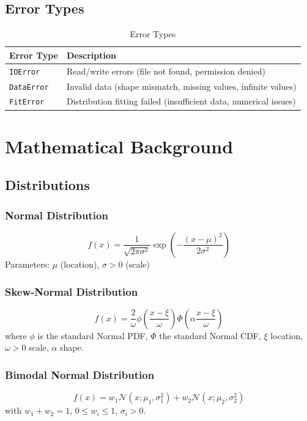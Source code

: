 ﻿\documentclass[12pt,a4paper]{report}
\begin{document}
\section{Error Types}
\begin{table}[H]
    \centering
    \caption{Error Types}
    \begin{tabular}{l l}
        \toprule
        \textbf{Error Type} & \textbf{Description} \\
        \midrule
        \texttt{IOError} & Read/write errors (file not found, permission denied) \\
        \texttt{DataError} & Invalid data (shape mismatch, missing values, infinite values) \\
        \texttt{FitError} & Distribution fitting failed (insufficient data, numerical issues) \\
        \bottomrule
    \end{tabular}
\end{table}

\chapter{Mathematical Background}

\section{Distributions}
\subsection{Normal Distribution}
\[
f(x) = \frac{1}{\sqrt{2\pi\sigma^2}} \exp\left(-\frac{(x-\mu)^2}{2\sigma^2}\right)
\]
Parameters: $\mu$ (location), $\sigma > 0$ (scale)

\subsection{Skew-Normal Distribution}
\[
f(x) = \frac{2}{\omega} \phi\left(\frac{x-\xi}{\omega}\right) \Phi\left(\alpha\frac{x-\xi}{\omega}\right)
\]
where $\phi$ is the standard Normal PDF, $\Phi$ the standard Normal CDF, $\xi$ location, $\omega > 0$ scale, $\alpha$ shape.

\subsection{Bimodal Normal Distribution}
\[
f(x) = w_1 \mathcal{N}(x; \mu_1, \sigma_1^2) + w_2 \mathcal{N}(x; \mu_2, \sigma_2^2)
\]
with $w_1 + w_2 = 1$, $0 \le w_i \le 1$, $\sigma_i > 0$.
\end{document}
